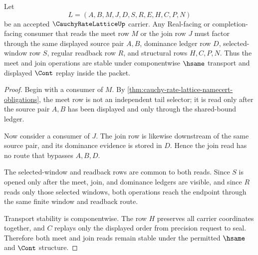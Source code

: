 \begin{theorem}
\label{thm:cauchy-rate-lattice-meet-join-stability}
Let
$$
L=(A,B,M,J,D,S,R,E,H,C,P,N)
$$
be an accepted $\CauchyRateLatticeUp$ carrier. Any Real-facing or completion-facing consumer that reads the meet row $M$ or the join row $J$ must factor through the same displayed source pair $A,B$, dominance ledger row $D$, selected-window row $S$, regular readback row $R$, and structural rows $H,C,P,N$. Thus the meet and join operations are stable under componentwise $\hsame$ transport and displayed $\Cont$ replay inside the packet.
\end{theorem}
\begin{proof}
Begin with a consumer of $M$. By \autoref{thm:cauchy-rate-lattice-namecert-obligations}, the meet row is not an independent tail selector; it is read only after the source pair $A,B$ has been displayed and only through the shared-bound ledger.

Now consider a consumer of $J$. The join row is likewise downstream of the same source pair, and its dominance evidence is stored in $D$. Hence the join read has no route that bypasses $A,B,D$.

The selected-window and readback rows are common to both reads. Since $S$ is opened only after the meet, join, and dominance ledgers are visible, and since $R$ reads only those selected windows, both operations reach the endpoint through the same finite window and readback route.

Transport stability is componentwise. The row $H$ preserves all carrier coordinates together, and $C$ replays only the displayed order from precision request to seal. Therefore both meet and join reads remain stable under the permitted $\hsame$ and $\Cont$ structure.
\end{proof}

